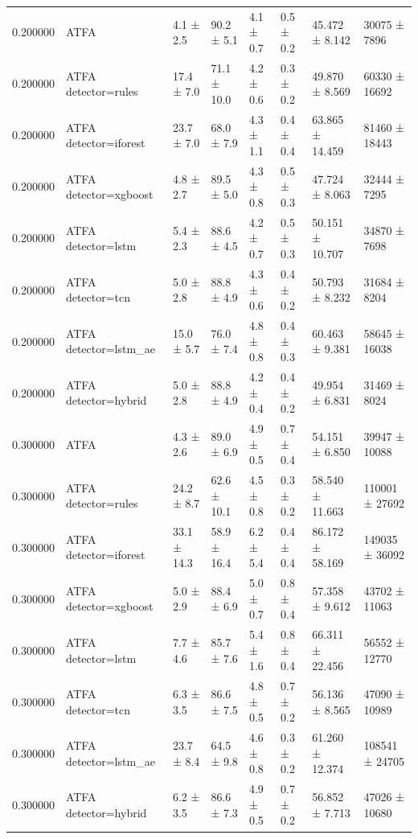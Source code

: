 \begin{tabular}{rlllllll}
0.200000 & ATFA & 4.1 ± 2.5 & 90.2 ± 5.1 & 4.1 ± 0.7 & 0.5 ± 0.2 & 45.472 ± 8.142 & 30075 ± 7896 \\
0.200000 & ATFA detector=rules & 17.4 ± 7.0 & 71.1 ± 10.0 & 4.2 ± 0.6 & 0.3 ± 0.2 & 49.870 ± 8.569 & 60330 ± 16692 \\
0.200000 & ATFA detector=iforest & 23.7 ± 7.0 & 68.0 ± 7.9 & 4.3 ± 1.1 & 0.4 ± 0.4 & 63.865 ± 14.459 & 81460 ± 18443 \\
0.200000 & ATFA detector=xgboost & 4.8 ± 2.7 & 89.5 ± 5.0 & 4.3 ± 0.8 & 0.5 ± 0.3 & 47.724 ± 8.063 & 32444 ± 7295 \\
0.200000 & ATFA detector=lstm & 5.4 ± 2.3 & 88.6 ± 4.5 & 4.2 ± 0.7 & 0.5 ± 0.3 & 50.151 ± 10.707 & 34870 ± 7698 \\
0.200000 & ATFA detector=tcn & 5.0 ± 2.8 & 88.8 ± 4.9 & 4.3 ± 0.6 & 0.4 ± 0.2 & 50.793 ± 8.232 & 31684 ± 8204 \\
0.200000 & ATFA detector=lstm\_ae & 15.0 ± 5.7 & 76.0 ± 7.4 & 4.8 ± 0.8 & 0.4 ± 0.3 & 60.463 ± 9.381 & 58645 ± 16038 \\
0.200000 & ATFA detector=hybrid & 5.0 ± 2.8 & 88.8 ± 4.9 & 4.2 ± 0.4 & 0.4 ± 0.2 & 49.954 ± 6.831 & 31469 ± 8024 \\
0.300000 & ATFA & 4.3 ± 2.6 & 89.0 ± 6.9 & 4.9 ± 0.5 & 0.7 ± 0.4 & 54.151 ± 6.850 & 39947 ± 10088 \\
0.300000 & ATFA detector=rules & 24.2 ± 8.7 & 62.6 ± 10.1 & 4.5 ± 0.8 & 0.3 ± 0.2 & 58.540 ± 11.663 & 110001 ± 27692 \\
0.300000 & ATFA detector=iforest & 33.1 ± 14.3 & 58.9 ± 16.4 & 6.2 ± 5.4 & 0.4 ± 0.4 & 86.172 ± 58.169 & 149035 ± 36092 \\
0.300000 & ATFA detector=xgboost & 5.0 ± 2.9 & 88.4 ± 6.9 & 5.0 ± 0.7 & 0.8 ± 0.4 & 57.358 ± 9.612 & 43702 ± 11063 \\
0.300000 & ATFA detector=lstm & 7.7 ± 4.6 & 85.7 ± 7.6 & 5.4 ± 1.6 & 0.8 ± 0.4 & 66.311 ± 22.456 & 56552 ± 12770 \\
0.300000 & ATFA detector=tcn & 6.3 ± 3.5 & 86.6 ± 7.5 & 4.8 ± 0.5 & 0.7 ± 0.2 & 56.136 ± 8.565 & 47090 ± 10989 \\
0.300000 & ATFA detector=lstm\_ae & 23.7 ± 8.4 & 64.5 ± 9.8 & 4.6 ± 0.8 & 0.3 ± 0.2 & 61.260 ± 12.374 & 108541 ± 24705 \\
0.300000 & ATFA detector=hybrid & 6.2 ± 3.5 & 86.6 ± 7.3 & 4.9 ± 0.5 & 0.7 ± 0.2 & 56.852 ± 7.713 & 47026 ± 10680 \\
\bottomrule
\end{tabular}
